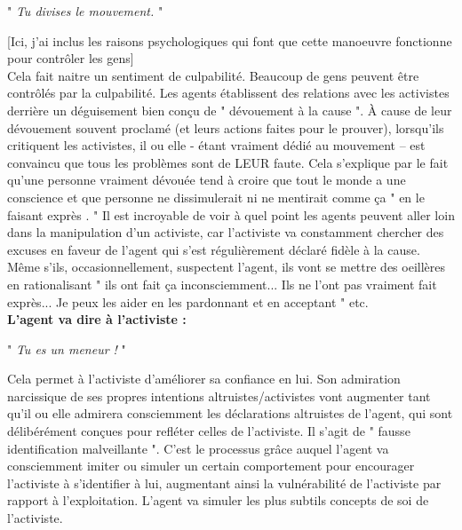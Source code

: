\documentclass[11pt,twoside,a4paper]{article}
\begin{document}
	" \emph{Tu divises le mouvement.} "~\\
\setlength\parindent{0pt}

[Ici, j'ai inclus les raisons psychologiques qui font que cette manoeuvre fonctionne pour contr{\^o}ler les gens]~\\

Cela fait naitre un sentiment de culpabilit{\'e}. Beaucoup de gens peuvent {\^e}tre contr{\^o}l{\'e}s par la culpabilit{\'e}. Les agents {\'e}tablissent des relations avec les activistes derri{\`e}re un d{\'e}guisement bien con\c{c}u de " d{\'e}vouement {\`a} la cause ". {\`A} cause de leur d{\'e}vouement souvent proclam{\'e} (et leurs actions faites pour le prouver), lorsqu'ils critiquent les activistes, il ou elle - {\'e}tant vraiment d{\'e}di{\'e} au mouvement -- est convaincu que tous les probl{\`e}mes sont de LEUR faute. Cela s'explique par le fait qu'une personne vraiment d{\'e}vou{\'e}e tend {\`a} croire que tout le monde a une conscience et que personne ne dissimulerait ni ne mentirait comme \c{c}a " en le faisant expr{\`e}s . " Il est incroyable de voir {\`a} quel point les agents peuvent aller loin dans la manipulation d'un activiste, car l'activiste va constamment chercher des excuses en faveur de l'agent qui s'est r{\'e}guli{\`e}rement d{\'e}clar{\'e} fid{\`e}le {\`a} la cause. M{\^e}me s'ils, occasionnellement, suspectent l'agent, ils vont se mettre des oeill{\`e}res en rationalisant " ils ont fait \c{c}a inconsciemment... Ils ne l'ont pas vraiment fait expr{\`e}s... Je peux les aider en les pardonnant et en acceptant " etc.~\\

\textbf{L'agent va dire {\`a} l'activiste : }~\\
\setlength\parindent{50pt}

	" \emph{Tu es un meneur !} "~\\
\setlength\parindent{0pt}

Cela permet {\`a} l'activiste d'am{\'e}liorer sa confiance en lui. Son admiration narcissique de ses propres intentions altruistes/activistes vont augmenter tant qu'il ou elle admirera consciemment les d{\'e}clarations altruistes de l'agent, qui sont d{\'e}lib{\'e}r{\'e}ment con\c{c}ues pour refl{\'e}ter celles de l'activiste. Il s'agit de " fausse identification malveillante ". C'est le processus gr{\^a}ce auquel l'agent va consciemment imiter ou simuler un certain comportement pour encourager l'activiste {\`a} s'identifier {\`a} lui, augmentant ainsi la vuln{\'e}rabilit{\'e} de l'activiste par rapport {\`a} l'exploitation. L'agent va simuler les plus subtils concepts de soi de l'activiste.~\\
\end{document}
